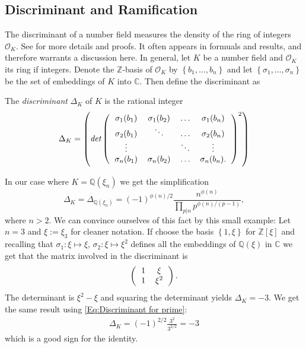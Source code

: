 \subsection{Discriminant and Ramification}
    The discriminant of a number field measures the density of the ring of integers \(\mathcal{O}_K\). See \cite{Basic Algebraic Number Theory} for more details and proofs. It often appears in formuals and results, and therefore warrants a discussion here. In general, let \(K\) be a number field and \(\mathcal{O}_K\) its ring if integers. Denote the \(\mathbb{Z}\)-basis of \(\mathcal{O}_K\) by \(\left\{b_1,\dots ,b_n\right\}\) and let \(\left\{\sigma_1,\dots ,\sigma_n\right\}\) be the set of embeddings of \(K\) into \(\mathbb{C}\). Then define the discriminant as
    \begin{definition}
    The \emph{discriminant} \(\Delta_K\) of \(K\) is the rational integer
    \begin{equation*}
        \Delta_K = \left(\emph{det}\left(\begin{tabular}{cccc}
             \(\sigma_1(b_1)\) & \(\sigma_1(b_2)\) & \(\dots\) & \(\sigma_1(b_n)\)  \\
             \(\sigma_2(b_1)\) & \(\ddots\) & \(\dots\) & \(\sigma_2(b_n)\)  \\
             \(\vdots\) & & \(\ddots\) & \(\vdots\) \\
             \(\sigma_n(b_1)\) & \(\sigma_n(b_2)\) & \(\dots\) & \(\sigma_n(b_n)\).
        \end{tabular}\right)^2\right)
    \end{equation*}
    \end{definition}
    In our case where \(K = \mathbb{Q}(\xi_n)\) we get the simplification
    \begin{equation}
        \Delta_K = \Delta_{\mathbb{Q}(\xi_n)} = (-1)^{\phi(n)/2}\frac{n^{\phi(n)}}{\prod\limits_{p|n}p^{\phi(n)/(p-1)}},
        \label{Eq:Discriminant for prime}
    \end{equation}
    where \(n > 2\). We can convince ourselves of this fact by this small example: Let \(n=3\) and \(\xi :=\xi_3\) for cleaner notation. If choose the basis \(\left\{1, \xi \right\}\) for \(\mathbb{Z}[\xi] \) and recalling that \(\sigma_1:\xi\mapsto\xi\), \(\sigma_2:\xi\mapsto\xi^2\) defines all the embeddings of \(\mathbb{Q}(\xi)\) in \(\mathbb{C}\) we get that the matrix involved in the discriminant is
    \begin{align*}
        \left(\begin{tabular}{ccc}
             1 & \(\xi\) \\
             1 & \(\xi^2\) \\
        \end{tabular}\right).
    \end{align*}
    The determinant is \(\xi^2-\xi\) and squaring the determinant yields \(\Delta_K = - 3\). We get the same result using \eqref{Eq:Discriminant for prime}:
    \begin{align*}
        \Delta_K = (-1)^{2/2}\frac{3^2}{3^{2/2}} = -3
    \end{align*}
    which is a good sign for the identity.

